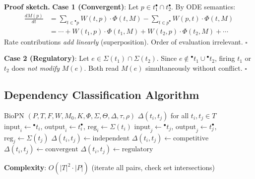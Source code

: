 \documentclass{article}
\newcommand{\preset}[1]{\ensuremath{{}^{\bullet}#1}}
\newcommand{\postset}[1]{\ensuremath{#1^{\bullet}}}
\newcommand{\RegSet}[1]{\ensuremath{\Sigma(#1)}}
\begin{document}
\textbf{Proof sketch.}
\textbf{Case 1 (Convergent)}: Let $p \in \postset{t_1} \cap \postset{t_2}$. By ODE semantics:
\begin{align}
\frac{dM(p)}{dt} &= \sum_{t \in \preset{p}} W(t,p) \cdot \Phi(t, M) - \sum_{t \in \postset{p}} W(p,t) \cdot \Phi(t, M) \\
&= \cdots + W(t_1,p) \cdot \Phi(t_1, M) + W(t_2,p) \cdot \Phi(t_2, M) + \cdots
\end{align}
Rate contributions \emph{add linearly} (superposition). Order of evaluation irrelevant. $\square$

\textbf{Case 2 (Regulatory)}: Let $e \in \RegSet{t_1} \cap \RegSet{t_2}$. Since $e \notin \preset{t_1} \cup \preset{t_2}$, firing $t_1$ or $t_2$ does \emph{not modify} $M(e)$. Both read $M(e)$ simultaneously without conflict. $\square$

\subsection{Dependency Classification Algorithm}

\begin{algorithm}[t]
\caption{Classify Transition Dependencies}
\label{alg:classify}
\begin{algorithmic}[1]
\REQUIRE BioPN $(P, T, F, W, M_0, K, \Phi, \Sigma, \Theta, \Delta, \tau, \rho)$
\ENSURE $\Delta(t_i, t_j)$ for all $t_i, t_j \in T$
    \STATE $\text{input}_i \gets \preset{t_i}$, $\text{output}_i \gets \postset{t_i}$, $\text{reg}_i \gets \RegSet{t_i}$
    \STATE $\text{input}_j \gets \preset{t_j}$, $\text{output}_j \gets \postset{t_j}$, $\text{reg}_j \gets \RegSet{t_j}$
        \STATE $\Delta(t_i, t_j) \gets \text{independent}$
        \STATE $\Delta(t_i, t_j) \gets \text{competitive}$
        \STATE $\Delta(t_i, t_j) \gets \text{convergent}$
        \STATE $\Delta(t_i, t_j) \gets \text{regulatory}$
    \ENDIF
\ENDFOR
\end{algorithmic}
\end{algorithm}

\textbf{Complexity}: $O(|T|^2 \cdot |P|)$ (iterate all pairs, check set intersections)
\end{document}
